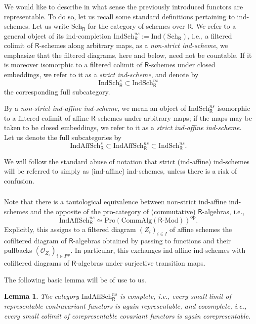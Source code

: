 \documentclass{amsart}
\newtheorem{Lem}[Thm]{Lemma}
\theoremstyle{definition}
\newcommand{\sss}{\subsubsection{}}
\newcommand{\OO}{\mathscr{O}}
\renewcommand{\mod}{\text{-}\on{Mod}}
\newcommand{\on}{\mathrm}
\newcommand{\Ring}{\mathsf{R}}
\numberwithin{equation}{section}
\begin{document}
\sss \label{SSS:ind_schemes} We would like to describe in what sense the previously introduced functors are representable. To do so, let us recall some standard definitions pertaining to ind-schemes. Let us write $\on{Sch}_\Ring$ for the category of schemes over $\Ring$.  We refer to a general object of its ind-completion $\on{IndSch}_\Ring^{ns} := \on{Ind}(\on{Sch}_\Ring)$, i.e., a filtered colimit of $\Ring$-schemes along arbitrary maps, as a {\em non-strict ind-scheme}, we emphasize that the filtered diagrams, here and below, need not be countable. If it is moreover isomorphic to a filtered colimit of  $\Ring$-schemes under closed embeddings, we refer to it as a {\em strict ind-scheme}, and denote by $$\on{IndSch}_\Ring^{s} \subset \on{IndSch}_\Ring^{ns}$$the corresponding full subcategory. 

 
 By a {\em non-strict ind-affine ind-scheme}, we mean an object of $\on{IndSch}_{\Ring}^{ns}$ isomorphic to a filtered colimit of affine $\Ring$-schemes under arbitrary maps; if the maps may be taken to be closed embeddings, we refer to it as a {\em strict ind-affine ind-scheme}. Let us denote the full subcategories by $$\on{IndAffSch}^{s}_\Ring \subset \on{IndAffSch}^{ns}_\Ring \subset \on{IndSch}_\Ring^{ns}.$$
 

  We will follow the standard abuse of notation that strict (ind-affine) ind-schemes will be referred to simply as (ind-affine) ind-schemes, unless there is a risk of confusion.



\sss Note that there is a tautological equivalence between non-strict ind-affine ind-schemes and the opposite of the pro-category of (commutative) $\Ring$-algebras, i.e.,   
$$\on{IndAffSch}_\Ring^{ns} \simeq \on{Pro}(\on{CommAlg}(\Ring\mod))^\on{op}.$$Explicitly, this assigns to a filtered diagram $(Z_i)_{i \in I}$ of affine schemes the cofiltered diagram of $\Ring$-algebras obtained by passing to functions and their pullbacks $(\OO_{Z_i})_{i \in I^{\on{op}}}$. In particular, this exchanges ind-affine ind-schemes with cofiltered diagrams of $\Ring$-algebras under surjective transition maps. 

The following basic lemma will be of use to us. 
\begin{Lem} \label{l:limcolim}The category $\on{IndAffSch}_{\Ring}^{ns}$ is complete, i.e., every small limit of representable contravariant functors is again representable, and cocomplete, i.e., every small colimit of corepresentable covariant functors is again corepresentable.  
\end{Lem}
\end{document}
